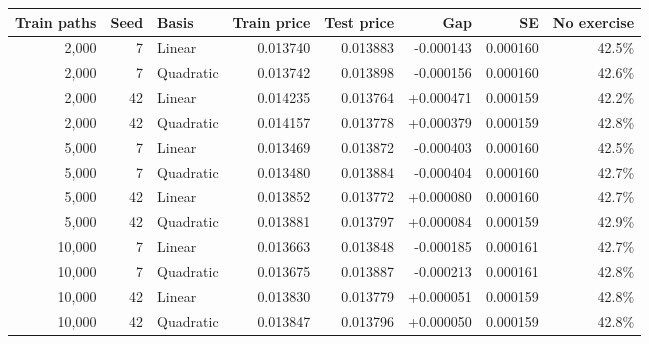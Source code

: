 \begin{tabular}{rrlrrrrr}
\toprule
Train paths & Seed & Basis & Train price & Test price & Gap & SE & No exercise \\
\midrule
2,000 & 7 & Linear & 0.013740 & 0.013883 & -0.000143 & 0.000160 & 42.5\% \\
2,000 & 7 & Quadratic & 0.013742 & 0.013898 & -0.000156 & 0.000160 & 42.6\% \\
2,000 & 42 & Linear & 0.014235 & 0.013764 & +0.000471 & 0.000159 & 42.2\% \\
2,000 & 42 & Quadratic & 0.014157 & 0.013778 & +0.000379 & 0.000159 & 42.8\% \\
5,000 & 7 & Linear & 0.013469 & 0.013872 & -0.000403 & 0.000160 & 42.5\% \\
5,000 & 7 & Quadratic & 0.013480 & 0.013884 & -0.000404 & 0.000160 & 42.7\% \\
5,000 & 42 & Linear & 0.013852 & 0.013772 & +0.000080 & 0.000160 & 42.7\% \\
5,000 & 42 & Quadratic & 0.013881 & 0.013797 & +0.000084 & 0.000159 & 42.9\% \\
10,000 & 7 & Linear & 0.013663 & 0.013848 & -0.000185 & 0.000161 & 42.7\% \\
10,000 & 7 & Quadratic & 0.013675 & 0.013887 & -0.000213 & 0.000161 & 42.8\% \\
10,000 & 42 & Linear & 0.013830 & 0.013779 & +0.000051 & 0.000159 & 42.8\% \\
10,000 & 42 & Quadratic & 0.013847 & 0.013796 & +0.000050 & 0.000159 & 42.8\% \\
\bottomrule
\end{tabular}
